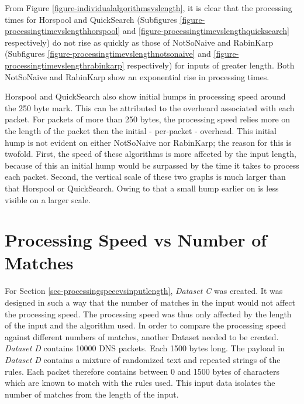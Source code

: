 \documentclass[11pt]{article}
\begin{document}
From Figure \ref{figure-individualalgorithmsvslength}, it is clear that the processing times for Horspool and QuickSearch (Subfigures \ref{figure-processingtimevslengthhorspool} and \ref{figure-processingtimevslengthquicksearch} respectively) do not rise as quickly as those of NotSoNaive and RabinKarp (Subfigures \ref{figure-processingtimevslengthnotsonaive} and \ref{figure-processingtimevslengthrabinkarp} respectively) for inputs of greater length. Both NotSoNaive and RabinKarp show an exponential rise in processing times. 

Horspool and QuickSearch also show initial humps in processing speed around the 250 byte mark. This can be attributed to the overheard associated with each packet. For packets of more than 250 bytes, the processing speed relies more on the length of the packet then the initial - per-packet - overhead. This initial hump is not evident on either NotSoNaive nor RabinKarp; the reason for this is twofold. First, the speed of these algorithms is more affected by the input length, because of this an initial hump would be surpassed by the time it takes to process each packet. Second, the vertical scale of these two graphs is much larger than that Horspool or QuickSearch. Owing to that a small hump earlier on is less visible on a larger scale.


\section{Processing Speed vs Number of Matches}

For Section \ref{sec-processingspeecvsinputlength}, \textit{Dataset C} was created. It was designed in such a way that the number of matches in the input would not affect the processing speed. The processing speed was thus only affected by the length of the input and the algorithm used. In order to compare the processing speed against different numbers of matches, another Dataset needed to be created. \textit{Dataset D} contains 10000 DNS packets. Each 1500 bytes long. The payload in \textit{Dataset D} contains a mixture of randomized text and repeated strings of the rules. Each packet therefore contains between 0 and 1500 bytes of characters which are known to match with the rules used. This input data isolates the number of matches from the length of the input.

\end{document}
